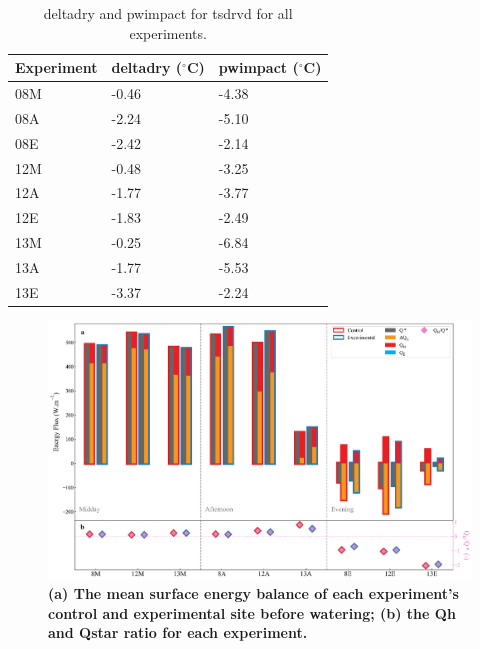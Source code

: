 \documentclass[final,3p,times,authoryear]{elsarticle}
\begin{document}
\begin{table}[!ht]\caption{\gls{deltadry} and \gls{pwimpact} for \gls{tsdrvd} for all experiments.}
    \centering
    \begin{tabular}{|l|l|l|}
    \hline
        Experiment & \gls{deltadry} ($^{\circ}$C) &\gls{pwimpact} ($^{\circ}$C) \\ \hline
        08M & -0.46&-4.38 \\ \hline
        08A & -2.24&-5.10 \\ \hline
        08E & -2.42&-2.14 \\ \hline
        12M & -0.48&-3.25 \\ \hline
        12A & -1.77&-3.77 \\ \hline
        12E & -1.83&-2.49 \\ \hline
        13M & -0.25&-6.84 \\ \hline
        13A & -1.77&-5.53 \\ \hline
        13E & -3.37&-2.24 \\ \hline
    \end{tabular}\label{table:7.5}
\end{table}





\begin{figure}
\centering
\includegraphics[trim={0 0 0 0},clip,scale=1.0]{pict046.png}
\caption{\bf (a) The mean surface energy balance of each experiment's control and experimental site before watering; (b) the \gls{Qh} and \gls{Qstar} ratio for each experiment.}
 \label{fig:7.18}
\end{figure}
\end{document}
